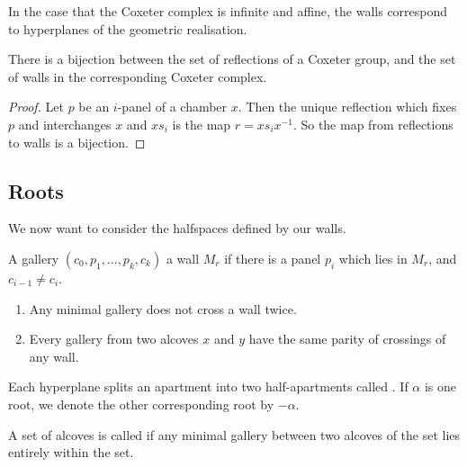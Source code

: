 \documentclass[11pt]{article}
\begin{document}
\begin{example}
    In the case that the Coxeter complex is infinite and affine, the walls correspond to hyperplanes of the geometric realisation. 
\end{example}

\begin{theorem}
    There is a bijection between the set of reflections of a Coxeter group, and the set of walls in the corresponding Coxeter complex.
\end{theorem}

\begin{proof}
    Let $p$ be an $i$-panel of a chamber $x$. Then the unique reflection which fixes $p$ and interchanges $x$ and $xs_i$ is the map $r=xs_ix^{-1}$. So the map from reflections to walls is a bijection.
\end{proof}



\subsection{Roots}

We now want to consider the halfspaces defined by our walls.

\begin{definition}
    A gallery $(c_0,p_1,...,p_k,c_k)$  a wall $M_r$ if there is a panel $p_i$ which lies in $M_r$, and $c_{i-1}\neq c_i$. 
\end{definition}

\begin{lemma}
    \begin{enumerate}
        \item Any minimal gallery does not cross a wall twice.
        \item Every gallery from two alcoves $x$ and $y$ have the same parity of crossings of any wall.
    \end{enumerate}
\end{lemma}


\begin{definition}
    Each hyperplane splits an apartment into two half-apartments called . If $\alpha$ is one root, we denote the other corresponding root by $-\alpha$. 
\end{definition}


\begin{definition}
    A set of alcoves is called  if any minimal gallery between two alcoves of the set lies entirely within the set. 
\end{definition}
\end{document}
